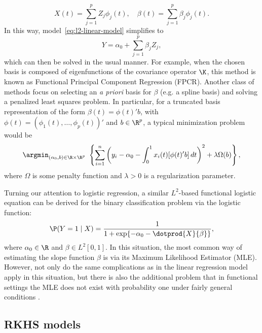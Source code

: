 \[
  X(t)=\sum_{j=1}^p Z_j \phi_j(t), \quad \beta(t) = \sum_{j=1}^p \beta_j \phi_j(t).
\]
In this way, model~\eqref{eq:l2-linear-model} simplifies to
\[
Y = \alpha_0 + \sum_{j=1}^p \beta_j Z_j,
\]
which can then be solved in the usual manner. For example, when the chosen basis is composed of eigenfunctions of the covariance operator \(\K\), this method is known as Functional Principal Component Regression (FPCR). Another class of methods focus on selecting an \textit{a priori} basis for \(\beta\) (e.g. a spline basis) and solving a penalized least squares problem. In particular, for a truncated basis representation of the form \(\beta(t)=\phi(t)'b\), with \(\phi(t)=(\phi_1(t), \dots, \phi_p(t))'\) and \(b\in\R^p\), a typical minimization problem would be
\[
\argmin_{(\alpha_0, b)\in\R\times\R^p} \ \left\{ \sum_{i=1}^n \left( y_i - \alpha_0 - \int_0^1 x_i(t)[\phi(t)'b]\, dt\right)^2 + \lambda \Omega(b) \right\},
\]
where \(\Omega\) is some penalty function and \(\lambda>0\) is a regularization parameter.

Turning our attention to logistic regression, a similar \(L^2\)-based functional logistic equation can be derived for the binary classification problem via the logistic function:
\begin{equation}\label{eq:l2-logistic-model}
  \P(Y=1 \mid X) = \frac{1}{1 + \exp\{-\alpha_0 - \dotprod{X}{\beta}\}},
\end{equation}
where \(\alpha_0 \in \R\) and \(\beta \in L^2[0, 1]\). In this situation, the most common way of estimating the slope function \(\beta\) is via its Maximum Likelihood Estimator (MLE). However, not only do the same complications as in the linear regression model apply in this situation, but there is also the additional problem that in functional settings the MLE does not exist with probability one under fairly general conditions \citep[see][Sec.~3.2]{berrendero2018functional}.

\subsection*{RKHS models}

